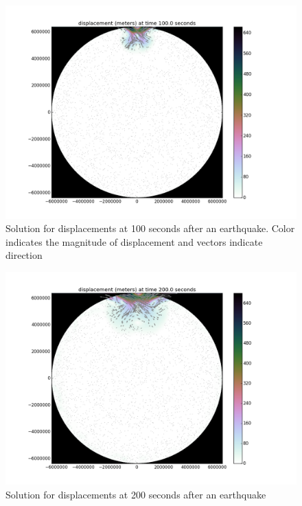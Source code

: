 \documentclass[12pt]{article}
\begin{document}
\begin{figure}
\includegraphics[scale=0.45]{figures/100s}
\centering
\caption{Solution for displacements at 100 seconds after an earthquake. Color
  indicates the magnitude of displacement and vectors indicate
  direction}
\end{figure}
\begin{figure}
\includegraphics[scale=0.45]{figures/200s}
\centering
\caption{Solution for displacements at 200 seconds after an earthquake}

\end{figure}
\end{document}
